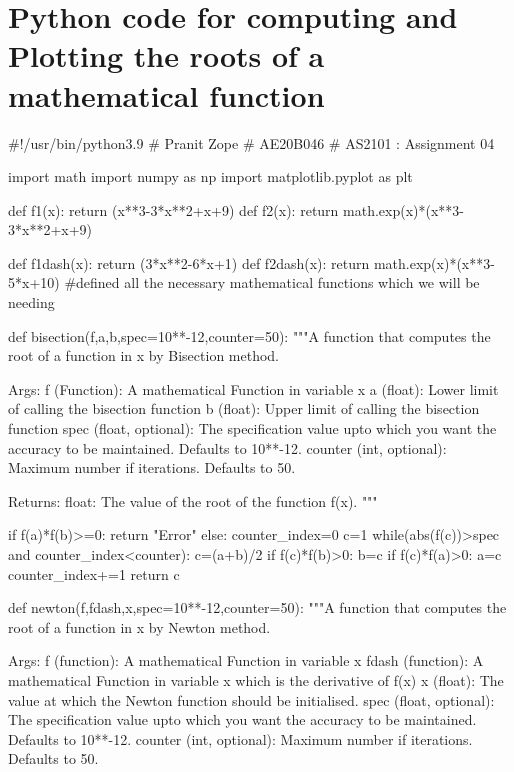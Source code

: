 \documentclass[12pt]{article}
\begin{document}
\newpage

\appendix
{}

\section{Python code for computing and Plotting the roots of a mathematical function}
\begin{python}
#!/usr/bin/python3.9
# Pranit Zope
# AE20B046
# AS2101 : Assignment 04

import math
import numpy as np
import matplotlib.pyplot as plt

def f1(x):
    return (x**3-3*x**2+x+9)
def f2(x):
    return math.exp(x)*(x**3-3*x**2+x+9)

def f1dash(x):
    return (3*x**2-6*x+1)    
def f2dash(x):
    return math.exp(x)*(x**3-5*x+10)
#defined all the necessary mathematical functions which we will be needing

def bisection(f,a,b,spec=10**-12,counter=50):
    """A function that computes the root of a function in x by Bisection method.

    Args:
        f (Function): A mathematical Function in variable x
        a (float): Lower limit of calling the bisection function
        b (float): Upper limit of calling the bisection function
        spec (float, optional): The specification value upto which you want the accuracy to be maintained. Defaults to 10**-12.
        counter (int, optional): Maximum number if iterations. Defaults to 50.

    Returns:
        float: The value of the root of the function f(x).
    """

    if f(a)*f(b)>=0:
        return "Error"
    else:
        counter_index=0
        c=1
        while(abs(f(c))>spec and counter_index<counter):
            c=(a+b)/2
            if f(c)*f(b)>0:
                b=c
            if f(c)*f(a)>0:
                a=c
            counter_index+=1
        return c



def newton(f,fdash,x,spec=10**-12,counter=50):
    """A function that computes the root of a function in x by Newton method.

    Args:
        f (function):  A mathematical Function in variable x
        fdash (function):  A mathematical Function in variable x which is the derivative of f(x)
        x (float): The value at which the Newton function should be initialised.
        spec (float, optional): The specification value upto which you want the accuracy to be maintained. Defaults to 10**-12.
        counter (int, optional): Maximum number if iterations. Defaults to 50.


\end{python}
\end{document}
